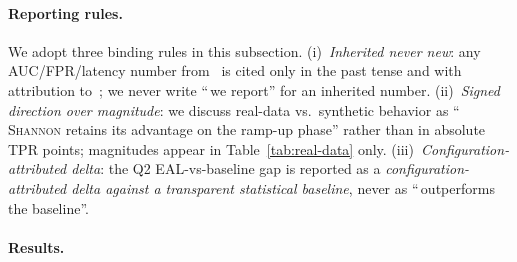 \documentclass[futureinternet,article,submit,pdftex,moreauthors]{Definitions/mdpi}
\begin{document}
\paragraph{Reporting rules.} We adopt three binding rules in this
subsection. (i)~\emph{Inherited never new}: any AUC/FPR/latency number
from~\cite{paper3} is cited only in the past tense and with attribution
to~\cite{paper3}; we never write ``\,we report'' for an inherited
number. (ii)~\emph{Signed direction over magnitude}: we discuss
real-data vs.\ synthetic behavior as
``\,\textsc{Shannon} retains its advantage on the ramp-up phase'' rather
than in absolute TPR points; magnitudes appear in
Table~\ref{tab:real-data} only. (iii)~\emph{Configuration-attributed
delta}: the Q2 EAL-vs-baseline gap is reported as a
\emph{configuration-attributed delta against a transparent statistical
baseline}, never as ``\,outperforms the baseline''.

\paragraph{Results.}
\begin{table}[t]
\centering
\caption{Real-data evaluation on the CIC-IDS2017-aligned proxy stream.
Each row is one $(E, W, s)$ EAL configuration or one z-score baseline
feature. Detection delay is measured from the first attack-labelled
second; ``miss'' marks configurations that never fire after that point.
The table is auto-generated by
\texttt{scripts/build\_table\_and\_pareto.py} from the
run JSONs and is regenerated unchanged when the proxy parquet is
replaced by the real CIC-IDS2017 CSV.}
\label{tab:real-data}
\scriptsize
{}
\end{table}
\end{document}
